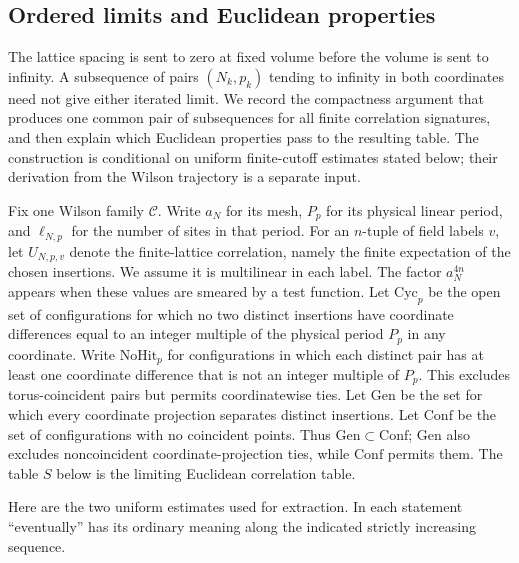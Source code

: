 \subsection{Ordered limits and Euclidean properties}
\label{sec:ex-limits}

The lattice spacing is sent to zero at fixed volume before the volume is sent to
infinity. A subsequence of pairs $(N_k,p_k)$ tending to infinity in both
coordinates need not give either iterated limit. We record the compactness
argument that produces one common pair of subsequences for all finite
correlation signatures, and then explain which Euclidean properties pass to
the resulting table. The construction is conditional on uniform finite-cutoff
estimates stated below; their derivation from the Wilson trajectory is a
separate input.

Fix one Wilson family $\mathcal C$. Write $a_N$ for its mesh, $P_p$ for its
physical linear period, and $\ell_{N,p}$ for the number of sites in that
period. For an $n$-tuple of field labels $v$,
let $U_{N,p,v}$ denote the finite-lattice correlation, namely the
finite expectation of the chosen insertions. We assume it is multilinear in
each label. The factor $a_N^{4n}$ appears when these values are smeared by a
test function. Let $\mathrm{Cyc}_p$
be the open set of configurations for which no two distinct insertions have
coordinate differences equal to an integer multiple of the physical period
$P_p$ in any coordinate. Write $\mathrm{NoHit}_p$ for configurations in which each distinct pair has
at least one coordinate difference that is not an integer multiple of $P_p$.
This excludes torus-coincident pairs but permits coordinatewise ties. Let $\mathrm{Gen}$ be the set for which every coordinate
projection separates distinct insertions. Let $\mathrm{Conf}$ be the set of
configurations with no coincident points. Thus $\mathrm{Gen}\subset\mathrm{Conf}$;
$\mathrm{Gen}$ also excludes noncoincident coordinate-projection ties, while
$\mathrm{Conf}$ permits them. The table $S$ below is the limiting Euclidean correlation table.

Here are the two uniform estimates used for extraction. In each statement
``eventually'' has its ordinary meaning along the indicated strictly
increasing sequence.

